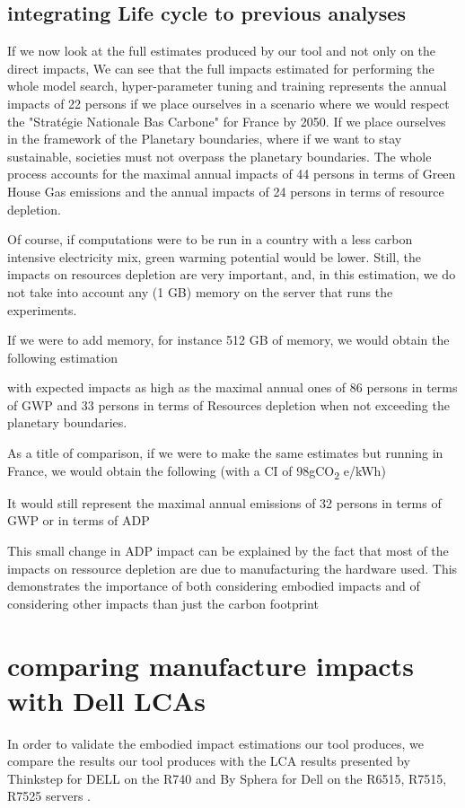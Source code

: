 \documentclass[11pt]{article}
\begin{document}
\subsection{integrating Life cycle to previous analyses}
\label{sec:org1301730}

If we now look at the full estimates produced by our tool and not only
on the direct impacts, 
We can see that the full impacts estimated for performing the whole
model search, hyper-parameter tuning and training represents the annual
impacts of 22 persons if we place ourselves in a scenario where we
would respect the "Stratégie Nationale Bas Carbone" for France
by 2050. If we place ourselves in the framework of the Planetary
boundaries, where if we want to stay sustainable, societies must not
overpass the planetary boundaries. The whole process accounts for the
maximal annual impacts of 44 persons in terms of Green House Gas
emissions and the annual impacts of 24 persons in terms of resource
depletion.

Of course, if computations were to be run in a country with a
less carbon intensive electricity mix, green warming potential would
be lower. Still, the impacts on resources depletion are very
important, and, in this estimation, we do not take into account any (1
GB) memory on the server that runs the experiments. 

If we were to add memory, for instance 512 GB of memory, we would
obtain the following estimation

with expected impacts as high as the maximal annual ones of 86 persons
in terms of \gls{GWP} and 33 persons in terms of Resources depletion
when not exceeding the planetary boundaries.

As a title of comparison, if we were to make the same estimates but
running in France, we would obtain the following (with a \gls{CI} of 98gCO\textsubscript{2} e/kWh)

It would still represent the maximal annual emissions of 32 persons in
terms of \gls{GWP} or in terms of \gls{ADP}

This small change in \gls{ADP} impact can be explained by the fact that most of
the impacts on ressource depletion are due to manufacturing the
hardware used. This demonstrates the importance of both considering
embodied impacts and of considering other impacts than just the carbon footprint




\section{comparing manufacture impacts with Dell LCAs}
\label{sec:org3076075}
\label{sec:manufacture_comparison}
In order to validate the embodied impact estimations our tool
produces, we compare the results our tool produces with the \gls{LCA}
results presented by Thinkstep for DELL on the R740
\cite{thinkstep2019lca} and By Sphera for Dell on the R6515, R7515, R7525
servers \cite{sphera2021lca}.
\end{document}
